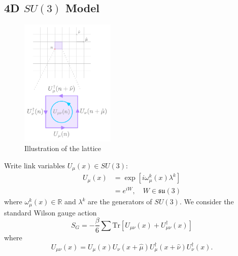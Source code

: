 \documentclass[a4paper,11pt]{article}
\begin{document}
\subsection{\label{subsec:4dSU3}4D \texorpdfstring{$SU(3)$}{SU(3)} Model}
%
\begin{figure}
  \begin{center}
    \caption{Illustration of the lattice}
    \includegraphics[width=0.4\textwidth]{assets/lattice}
  \end{center}
  \label{fig:lattice}
\end{figure}
%
Write link variables $U_{\mu}(x) \in SU(3)$:
%
\begin{align}
U_{\mu}(x) &= \exp\left[i \omega_{\mu}^{k}(x) \lambda^{k} \right] \\
&= e^{iW}, \quad W \in \mathfrak{su}(3)
\end{align}
%
where $\omega_{\mu}^{k}(x) \in \mathbb{R}$ and $\lambda^{k}$ are the generators
of $SU(3)$.
%
We consider the standard Wilson gauge action
%
\begin{equation}
S_{G} = -\frac{\beta}{6}\sum \mathrm{Tr}\left[U_{\mu\nu}(x) + U^{\dagger}_{\mu\nu}(x) \right]
\end{equation}
%
where 
\begin{equation*}
    U_{\mu\nu}(x) = U_{\mu}(x) U_{\nu}(x + \hat{\mu}) U_{\mu}^{\dagger}(x + \hat{\nu}) U^{\dagger}_{\nu}(x).
\end{equation*}

%
\end{document}
